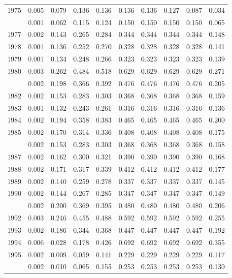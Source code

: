\documentclass[
]{article}
\begin{document}
\begin{longtable}[t]{lrrrrrrrrr}
1975 & 0.005 & 0.079 & 0.136 & 0.136 & 0.136 & 0.136 & 0.127 & 0.087 & 0.034\\
\addlinespace
1976 & 0.001 & 0.062 & 0.115 & 0.124 & 0.150 & 0.150 & 0.150 & 0.150 & 0.065\\
1977 & 0.002 & 0.143 & 0.265 & 0.284 & 0.344 & 0.344 & 0.344 & 0.344 & 0.148\\
1978 & 0.001 & 0.136 & 0.252 & 0.270 & 0.328 & 0.328 & 0.328 & 0.328 & 0.141\\
1979 & 0.001 & 0.134 & 0.248 & 0.266 & 0.323 & 0.323 & 0.323 & 0.323 & 0.139\\
1980 & 0.003 & 0.262 & 0.484 & 0.518 & 0.629 & 0.629 & 0.629 & 0.629 & 0.271\\
\addlinespace
1981 & 0.002 & 0.198 & 0.366 & 0.392 & 0.476 & 0.476 & 0.476 & 0.476 & 0.205\\
1982 & 0.002 & 0.153 & 0.283 & 0.303 & 0.368 & 0.368 & 0.368 & 0.368 & 0.159\\
1983 & 0.001 & 0.132 & 0.243 & 0.261 & 0.316 & 0.316 & 0.316 & 0.316 & 0.136\\
1984 & 0.002 & 0.194 & 0.358 & 0.383 & 0.465 & 0.465 & 0.465 & 0.465 & 0.200\\
1985 & 0.002 & 0.170 & 0.314 & 0.336 & 0.408 & 0.408 & 0.408 & 0.408 & 0.175\\
\addlinespace
1986 & 0.002 & 0.153 & 0.283 & 0.303 & 0.368 & 0.368 & 0.368 & 0.368 & 0.158\\
1987 & 0.002 & 0.162 & 0.300 & 0.321 & 0.390 & 0.390 & 0.390 & 0.390 & 0.168\\
1988 & 0.002 & 0.171 & 0.317 & 0.339 & 0.412 & 0.412 & 0.412 & 0.412 & 0.177\\
1989 & 0.002 & 0.140 & 0.259 & 0.278 & 0.337 & 0.337 & 0.337 & 0.337 & 0.145\\
1990 & 0.002 & 0.144 & 0.267 & 0.285 & 0.347 & 0.347 & 0.347 & 0.347 & 0.149\\
\addlinespace
1991 & 0.002 & 0.200 & 0.369 & 0.395 & 0.480 & 0.480 & 0.480 & 0.480 & 0.206\\
1992 & 0.003 & 0.246 & 0.455 & 0.488 & 0.592 & 0.592 & 0.592 & 0.592 & 0.255\\
1993 & 0.002 & 0.186 & 0.344 & 0.368 & 0.447 & 0.447 & 0.447 & 0.447 & 0.192\\
1994 & 0.006 & 0.028 & 0.178 & 0.426 & 0.692 & 0.692 & 0.692 & 0.692 & 0.355\\
1995 & 0.002 & 0.009 & 0.059 & 0.141 & 0.229 & 0.229 & 0.229 & 0.229 & 0.117\\
\addlinespace
1996 & 0.002 & 0.010 & 0.065 & 0.155 & 0.253 & 0.253 & 0.253 & 0.253 & 0.130\\

\end{longtable}
\end{document}
